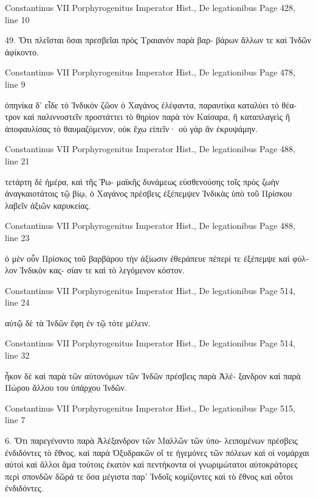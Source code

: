 \documentclass[12pt,letterpaper,twoside,final]{memoir}
\begin{document}
\begin{greek}
Constantinus VII Porphyrogenitus Imperator Hist., De legationibus 
Page 428, line 10

49. Ὅτι πλεῖσται ὅσαι πρεσβεῖαι πρὸς Τραιανὸν παρὰ βαρ-
βάρων ἄλλων τε καὶ Ἰνδῶν ἀφίκοντο. 



Constantinus VII Porphyrogenitus Imperator Hist., De legationibus 
Page 478, line 9

                                              ὁπηνίκα δ' εἶδε τὸ 
Ἰνδικὸν ζῶον ὁ Χαγάνος ἐλέφαντα, παραυτίκα καταλύει τὸ θέα-
τρον καὶ παλιννοστεῖν προστάττει τὸ θηρίον παρὰ τὸν Καίσαρα, 
ἢ καταπλαγεὶς ἢ ἀποφαυλίσας τὸ θαυμαζόμενον, οὐκ ἔχω εἰπεῖν· 
οὐ γὰρ ἂν ἐκρυψάμην. 



Constantinus VII Porphyrogenitus Imperator Hist., De legationibus 
Page 488, line 21

                                 τετάρτη δὲ ἡμέρα, καὶ τῆς Ῥω-
μαϊκῆς δυνάμεως εὐσθενούσης τοῖς πρὸς ζωὴν ἀναγκαιοτάτοις τῷ 
βίῳ, ὁ Χαγάνος πρέσβεις ἐξέπεμψεν Ἰνδικὰς ὑπὸ τοῦ Πρίσκου 
λαβεῖν ἀξιῶν καρυκείας. 



Constantinus VII Porphyrogenitus Imperator Hist., De legationibus 
Page 488, line 23

                            ὁ μὲν οὖν Πρίσκος τοῦ βαρβάρου τὴν 
ἀξίωσιν ἐθεράπευε πέπερί τε ἐξέπεμψε καὶ φύλλον Ἰνδικὸν κας-
σίαν τε καὶ τὸ λεγόμενον κόστον. 



Constantinus VII Porphyrogenitus Imperator Hist., De legationibus 
Page 514, line 24

                                                    αὐτῷ δὲ τὰ Ἰνδῶν 
ἔφη ἐν τῷ τότε μέλειν. 



Constantinus VII Porphyrogenitus Imperator Hist., De legationibus 
Page 514, line 32

ἧκον δὲ καὶ παρὰ τῶν αὐτονόμων τῶν Ἰνδῶν πρέσβεις παρὰ Ἀλέ-
ξανδρον καὶ παρὰ Πώρου ἄλλου του ὑπάρχου Ἰνδῶν. 



Constantinus VII Porphyrogenitus Imperator Hist., De legationibus 
Page 515, line 7

6. Ὅτι παρεγένοντο παρὰ Ἀλέξανδρον τῶν Μαλλῶν τῶν ὑπο-
λειπομένων πρέσβεις ἐνδιδόντες τὸ ἔθνος, καὶ παρὰ Ὀξυδρακῶν 
οἵ τε ἡγεμόνες τῶν πόλεων καὶ οἱ νομάρχαι αὐτοὶ καὶ ἄλλοι ἅμα 
τούτοις ἑκατὸν καὶ πεντήκοντα οἱ γνωριμώτατοι αὐτοκράτορες περὶ 
σπονδῶν δῶρά τε ὅσα μέγιστα παρ' Ἰνδοῖς κομίζοντες καὶ τὸ 
ἔθνος καὶ οὗτοι ἐνδιδόντες. 




\end{greek}
\end{document}
